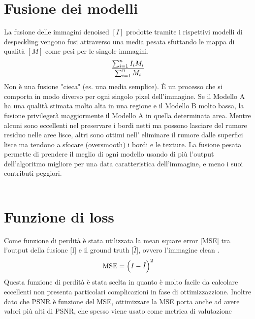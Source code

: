 \section{Fusione dei modelli}
La fusione delle immagini denoised $[I]$ prodotte tramite i rispettivi modelli di despeckling vengono fusi attraverso una media pesata sfuttando
le mappa di qualità $[M]$ come pesi per le singole immagini.
\begin{equation}
    \makebox[\textwidth][c]{%
      $\displaystyle
        \frac{\sum_{i=1}^{n} I_i M_i}{\sum_{i=1}^{n} M_i}
      $%
    }
\end{equation}
Non è una fusione "cieca" (es. una media semplice). È un processo che si 
comporta in modo diverso per ogni singolo pixel dell'immagine. Se il Modello A ha una qualità stimata 
molto alta in una regione e il Modello B molto bassa, la fusione privilegerà maggiormente 
il Modello A in quella determinata area. Mentre alcuni sono eccellenti nel preservare i bordi netti ma possono lasciare del rumore residuo nelle aree lisce, 
altri sono ottimi nell' eliminare il rumore dalle superfici lisce ma tendono a sfocare (oversmooth) i bordi e le texture.
La fusione pesata permette di prendere il meglio di ogni modello usando di più l'output dell'algoritmo migliore per una data 
caratteristica dell'immagine, e meno i suoi contributi peggiori.
\\\\
\section{Funzione di loss}
Come funzione di perdità è stata utilizzata la mean square error [MSE] tra l'output della fusione [I] 
e il ground truth [$\hat{I}$], ovvero l'immagine clean . 
\begin{equation}
  \makebox[\textwidth][c]{%
    $\displaystyle
    \text{MSE} = \left( I - \hat{I} \right)^2
    $%
  }
\end{equation}
Questa funzione di perdità è stata scelta in quanto è molto facile da calcolare eccellenti 
non presenta particolari complicazioni in fase di ottimizzazzione. Inoltre 
dato che PSNR è funzione del MSE, ottimizzare la MSE porta anche ad avere valori 
più alti di PSNR, che spesso viene usato come metrica di valutazione 


